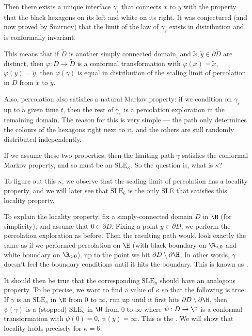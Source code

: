 \documentclass[a4paper]{article}
\newcommand\SLE{\mathrm{SLE}}
\begin{document}
Then there exists a unique interface $\gamma_\varepsilon$ that connects $x$ to $y$ with the property that the black hexagons on its left and white on its right. It was conjectured (and now proved by Smirnov) that the limit of the law of $\gamma_\varepsilon$ exists in distribution and is conformally invariant.

This means that if $\tilde{D}$ is another simply connected domain, and $\tilde{x}, \tilde{y} \in \partial \tilde{D}$ are distinct, then $\varphi: D \to \tilde{D}$ is a conformal transformation with $\varphi(x) = \tilde{x}$, $\varphi(y) = \tilde{y}$, then $\varphi(\gamma)$ is equal in distribution of the scaling limit of percolation in $\tilde{D}$ from $\tilde{x}$ to $\tilde{y}$.

Also, percolation also satisfies a natural Markov property: if we condition on $\gamma_\varepsilon$ up to a given time $t$, then the rest of $\gamma_\varepsilon$ is a percolation exploration in the remaining domain. The reason for this is very simple --- the path only determines the colours of the hexagons right next to it, and the others are still randomly distributed independently.

If we assume these two properties, then the limiting path $\gamma$ satisfies the conformal Markov property, and so must be an $\SLE_\kappa$. So the question is, what is $\kappa$?

To figure out this $\kappa$, we observe that the scaling limit of percolation has a locality property, and we will later see that $\SLE_6$ is the only SLE that satisfies this locality property.

To explain the locality property, fix a simply-connected domain $D$ in $\H$ (for simplicity), and assume that $0 \in \partial D$. Fixing a point $y \in \partial D$, we perform the percolation exploration as before. Then the resulting path would look exactly the same as if we performed percolation on $\H$ (with black boundary on $\R_{<0}$ and white boundary on $\R_{>0}$), up to the point we hit $\partial D \setminus \partial \H$. In other words, $\gamma$ doesn't feel the boundary conditions until it hits the boundary. This is known as .

It should then be true that the corresponding $\SLE_\kappa$ should have an analogous property. To be precise, we want to find a value of $\kappa$ so that the following is true: If $\gamma$ is an $\SLE_\kappa$ in $\H$ from $0$ to $\infty$, run up until it first hits $\partial D \setminus \partial \H$, then $\psi(\gamma)$ is a (stopped) $\SLE_\kappa$ in $\H$ from $0$ to $\infty$ where $\psi: D \to \H$ is a conformal transformation with $\psi(0) = 0$, $\psi(y) = \infty$. This is the . We will show that locality holds precisely for $\kappa = 6$.
\end{document}

